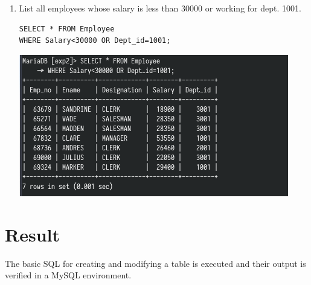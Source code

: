 \documentclass[13pt,oneside]{book}
\begin{document}
\begin{enumerate}
			\item
List all employees whose salary is less than 30000 or working for dept.
1001.

    \begin{verbatim}
SELECT * FROM Employee
WHERE Salary<30000 OR Dept_id=1001;

    \end{verbatim}
	\includegraphics[]{img/p2/ss12.png}
	
	\end{enumerate}
	\section*{Result}
	The basic SQL for creating and modifying a table is executed and their output
	is verified in a MySQL environment.
\end{document}
